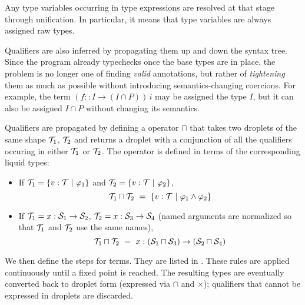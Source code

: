 Any type variables occurring in type expressions are resolved at that
stage through unification. In particular, it means that type variables are always assigned raw types.

Qualifiers are also inferred by propagating them up and down the syntax tree.
Since the program already typechecks once the base types are in place, the problem is no longer
one of finding {\em valid} annotations, but rather of {\em tightening} them as much as possible
without introducing semantics-changing coercions. For example, the term $(f :: I\to(I\cap P))\,i$ may
be assigned the type $I$, but it can also be assigned $I\cap P$ without changing its semantics.

Qualifiers are propagated by defining a  operator $\sqcap$ that
takes two droplets of the same shape $\mathcal{T}_1$, $\mathcal{T}_2$ and returns a droplet with a conjunction of all the qualifiers
occuring in either $\mathcal{T}_1$ or $\mathcal{T}_2$. The operator is defined in terms of the corresponding liquid types:
\begin{itemize}
  \item If $\mathcal{T}_1=\{v:\mathcal{T} ~|~ \varphi_1\}$ and $\mathcal{T}_2=\{v:\mathcal{T} ~|~ \varphi_2\}$,
	\[\mathcal{T}_1\sqcap\mathcal{T}_2 ~=~ \{v:\mathcal{T} ~|~ \varphi_1\land\varphi_2\}\]
  \item If $\mathcal{T}_1=x:\mathcal{S}_1\to\mathcal{S}_2$, $\mathcal{T}_2=x:\mathcal{S}_3\to\mathcal{S}_4$ (named arguments are normalized so that $\mathcal{T}_1$ and $\mathcal{T}_2$ use the same names),
    \[\mathcal{T}_1\sqcap\mathcal{T}_2 ~=~ x:(\mathcal{S}_1\sqcap\mathcal{S}_3)\to(\mathcal{S}_2\sqcap\mathcal{S}_4)\]
\end{itemize}

We then define the  steps for terms. They are listed in .
These rules are applied continuously until a fixed point is reached.
The resulting types are eventually converted back to droplet form (expressed via $\cap$ and $\times$);
qualifiers that cannot be expressed in droplets are discarded.

